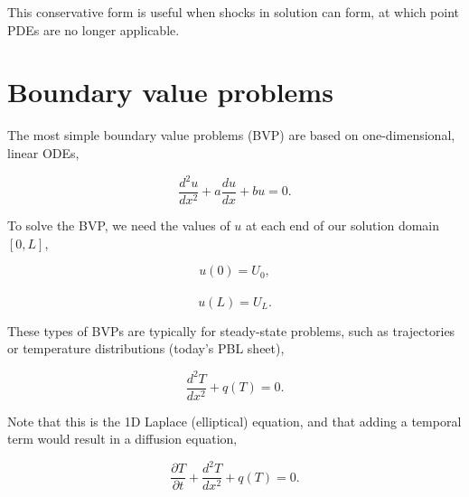 \documentclass[12pt]{article}
\begin{document}
\vspace{4mm}

This conservative form is useful when shocks in solution can form, at which point PDEs are no longer applicable.


\section{Boundary value problems}

The most simple boundary value problems (BVP) are based on one-dimensional, linear ODEs,

\vspace{2mm}

$$ \frac{d^2u}{dx^2} + a\frac{du}{dx} + bu = 0.$$

\vspace{4mm}

To solve the BVP, we need the values of $u$ at each end of our solution domain $[0,L]$,

\vspace{2mm}

$$ u(0)=U_0, $$\\[-4ex]
$$ u(L)=U_L.$$ 

\vspace{4mm}

These types of BVPs are typically for steady-state problems, such as trajectories or temperature distributions (today's PBL sheet),

\vspace{2mm}

$$ \frac{d^2T}{dx^2} + q(T) = 0.$$

\vspace{4mm}

Note that this is the 1D Laplace (elliptical) equation, and that adding a temporal term would result in a diffusion equation,

$$  \frac{\partial T}{\partial t} + \frac{d^2T}{dx^2} + q(T) = 0.$$
\end{document}
